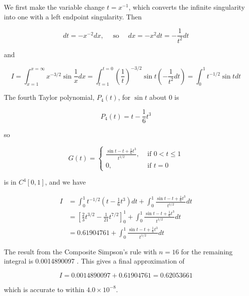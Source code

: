 \begin{mysolution}
We first make the variable change $t=x^{-1}$, which converts the infinite singularity into one with a left endpoint singularity. Then

$$
d t=-x^{-2} d x, \quad \text { so } \quad d x=-x^{2} d t=-\frac{1}{t^{2}} d t
$$

and

$$
I=\int_{x=1}^{x=\infty} x^{-3 / 2} \sin \frac{1}{x} d x=\int_{t=1}^{t=0}\left(\frac{1}{t}\right)^{-3 / 2} \sin t\left(-\frac{1}{t^{2}} d t\right)=\int_{0}^{1} t^{-1 / 2} \sin t d t
$$

The fourth Taylor polynomial, $P_{4}(t)$, for $\sin t$ about 0 is

$$
P_{4}(t)=t-\frac{1}{6} t^{3}
$$

so

$$
G(t)= \begin{cases}\frac{\sin t-t+\frac{1}{6} t^{3}}{t^{1 / 2}}, & \text { if } 0<t \leq 1 \\ 0, & \text { if } t=0\end{cases}
$$

is in $C^{4}[0,1]$, and we have

$$
\begin{aligned}
I & =\int_{0}^{1} t^{-1 / 2}\left(t-\frac{1}{6} t^{3}\right) d t+\int_{0}^{1} \frac{\sin t-t+\frac{1}{6} t^{3}}{t^{1 / 2}} d t \\
& =\left[\frac{2}{3} t^{3 / 2}-\frac{1}{21} t^{7 / 2}\right]_{0}^{1}+\int_{0}^{1} \frac{\sin t-t+\frac{1}{6} t^{3}}{t^{1 / 2}} d t \\
& =0.61904761+\int_{0}^{1} \frac{\sin t-t+\frac{1}{6} t^{3}}{t^{1 / 2}} d t
\end{aligned}
$$

The result from the Composite Simpson's rule with $n=16$ for the remaining integral is 0.0014890097 . This gives a final approximation of

$$
I=0.0014890097+0.61904761=0.62053661
$$

which is accurate to within $4.0 \times 10^{-8}$.
\end{mysolution}
